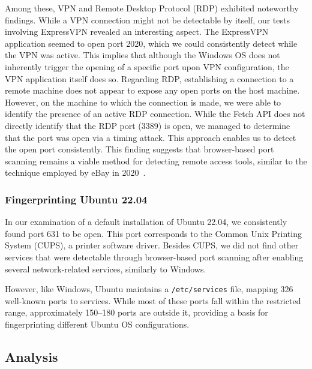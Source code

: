 Among these, VPN and Remote Desktop Protocol (RDP) exhibited noteworthy findings. While a VPN connection might not be detectable by itself, our tests involving ExpressVPN revealed an interesting aspect. The ExpressVPN application seemed to open port 2020, which we could consistently detect while the VPN was active. This implies that although the Windows OS does not inherently trigger the opening of a specific port upon VPN configuration, the VPN application itself does so.
Regarding RDP, establishing a connection to a remote machine does not appear to expose any open ports on the host machine. However, on the machine to which the connection is made, we were able to identify the presence of an active RDP connection. While the Fetch API does not directly identify that the RDP port (3389) is open, we managed to determine that the port was open via a timing attack. This approach enables us to detect the open port consistently. This finding suggests that browser-based port scanning remains a viable method for detecting remote access tools, similar to the technique employed by eBay in 2020~\cite{ebay_port_scans}.

\subsubsection{Fingerprinting Ubuntu 22.04}

In our examination of a default installation of Ubuntu 22.04, we consistently found port 631 to be open. This port corresponds to the Common Unix Printing System (CUPS), a printer software driver.
Besides CUPS, we did not find other services that were detectable through browser-based port scanning after enabling several network-related services, similarly to Windows.

However, like Windows, Ubuntu maintains a \texttt{/etc/services} file, mapping 326 well-known ports to services. While most of these ports fall within the restricted range, approximately 150–180 ports are outside it, providing a basis for fingerprinting different Ubuntu OS configurations.

\subsection{Analysis}

